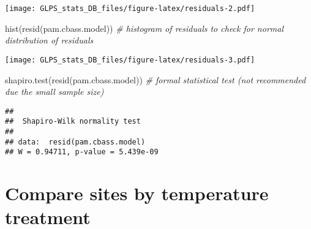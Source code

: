 \documentclass[
]{article}
\newenvironment{Shaded}{\begin{snugshade}}{\end{snugshade}}
\newcommand{\AttributeTok}[1]{\textcolor[rgb]{0.77,0.63,0.00}{#1}}
\newcommand{\CommentTok}[1]{\textcolor[rgb]{0.56,0.35,0.01}{\textit{#1}}}
\newcommand{\FunctionTok}[1]{\textcolor[rgb]{0.00,0.00,0.00}{#1}}
\newcommand{\NormalTok}[1]{#1}
\newcommand{\OtherTok}[1]{\textcolor[rgb]{0.56,0.35,0.01}{#1}}
\newcommand{\SpecialCharTok}[1]{\textcolor[rgb]{0.00,0.00,0.00}{#1}}
\newcommand{\StringTok}[1]{\textcolor[rgb]{0.31,0.60,0.02}{#1}}
\begin{document}
\texttt{[image: GLPS\_stats\_DB\_files/figure-latex/residuals-2.pdf]}

\begin{Shaded}
\begin{Highlighting}[]
\FunctionTok{hist}\NormalTok{(}\FunctionTok{resid}\NormalTok{(pam.cbass.model)) }\CommentTok{\# histogram of residuals to check for normal distribution of residuals}
\end{Highlighting}
\end{Shaded}

\texttt{[image: GLPS\_stats\_DB\_files/figure-latex/residuals-3.pdf]}

\begin{Shaded}
\begin{Highlighting}[]
\FunctionTok{shapiro.test}\NormalTok{(}\FunctionTok{resid}\NormalTok{(pam.cbass.model)) }\CommentTok{\# formal statistical test (not recommended due the small sample size)}
\end{Highlighting}
\end{Shaded}

\begin{verbatim}
## 
##  Shapiro-Wilk normality test
## 
## data:  resid(pam.cbass.model)
## W = 0.94711, p-value = 5.439e-09
\end{verbatim}

\hypertarget{compare-sites-by-temperature-treatment}{%
\section{Compare sites by temperature
treatment}\label{compare-sites-by-temperature-treatment}}

\begin{Shaded}
\end{Shaded}
\end{document}
